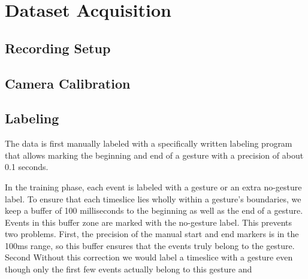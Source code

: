 \chapter{Dataset Acquisition}
\label{chapter:acquisition}

\section{Recording Setup}
\label{sec:setup}

\section{Camera Calibration}
\label{sec:calibration}

\section{Labeling}
\label{sec:labeling}

The data is first manually labeled with a specifically written labeling program that allows marking the beginning and end of a gesture with a precision of about 0.1 seconds.

In the training phase, each event is labeled with a gesture or an extra no-gesture label.
To ensure that each timeslice lies wholly within a gesture's boundaries, we keep a buffer of 100 milliseconds to the beginning as well as the end of a gesture.
Events in this buffer zone are marked with the no-gesture label.
This prevents two problems.
First, the precision of the manual start and end markers is in the 100ms range, so this buffer ensures that the events truly belong to the gesture.
Second
Without this correction we would label a timeslice with a gesture even though only the first few events actually belong to this gesture and
